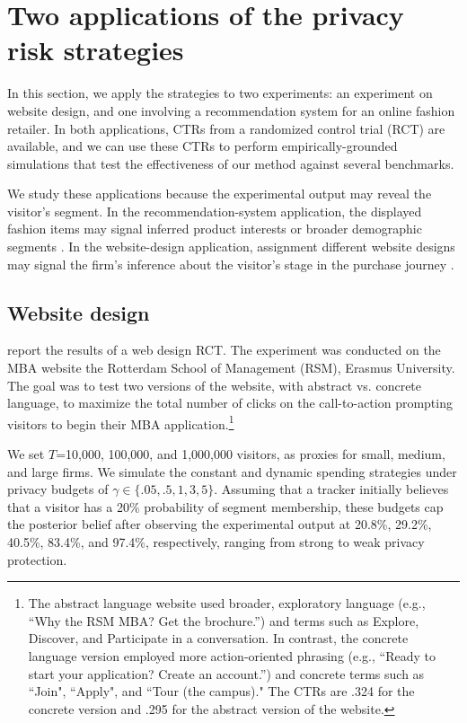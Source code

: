 \documentclass[mksc,nonblindrev]{informs3}
\begin{document}
\section{Two applications of the privacy risk strategies}\label{sec:applications}
In this section, we apply the strategies to two experiments: an experiment on website design, and one involving a recommendation system for an online fashion retailer. In both applications, CTRs from a randomized control trial (RCT) are available, and we can use these CTRs to perform empirically-grounded simulations that test the effectiveness of our method against several benchmarks.

We study these applications because the experimental output may reveal the visitor's segment. In the recommendation-system application, the displayed fashion items may signal inferred product interests or broader demographic segments \citep{Castelluccia_2012, Xin_2023, Chen_2026}. In the website-design application, assignment different website designs may signal the firm's inference about the visitor's stage in the purchase journey \citep{Hauser_2009, Liberali_2022}.

\subsection{Website design}
\citet{Liberali_2022} report the results of a web design RCT. The experiment was conducted on the MBA website the Rotterdam School of Management (RSM), Erasmus University. The goal was to test two versions of the website, with abstract vs. concrete language, to maximize the total number of clicks on the call-to-action prompting visitors to begin their MBA application.\footnote{The abstract language website used broader, exploratory language (e.g., “Why the RSM MBA? Get the brochure.”) and terms such as Explore, Discover, and Participate in a conversation. In contrast, the concrete language version employed more action-oriented phrasing (e.g., “Ready to start your application? Create an account.”) and concrete terms such as ``Join", ``Apply", and ``Tour (the campus)." The CTRs are .324 for the concrete version and .295 for the abstract version of the website.}

We set $T$=10,000, 100,000, and 1,000,000 visitors, as proxies for small, medium, and large firms. We simulate the constant and dynamic spending strategies under privacy budgets of $\gamma \in \{.05, .5, 1, 3, 5\}$. Assuming that a tracker initially believes that a visitor has a 20\% probability of segment membership, these budgets cap the posterior belief after observing the experimental output at 20.8\%, 29.2\%, 40.5\%, 83.4\%, and 97.4\%, respectively, ranging from strong to weak privacy protection.
\end{document}
